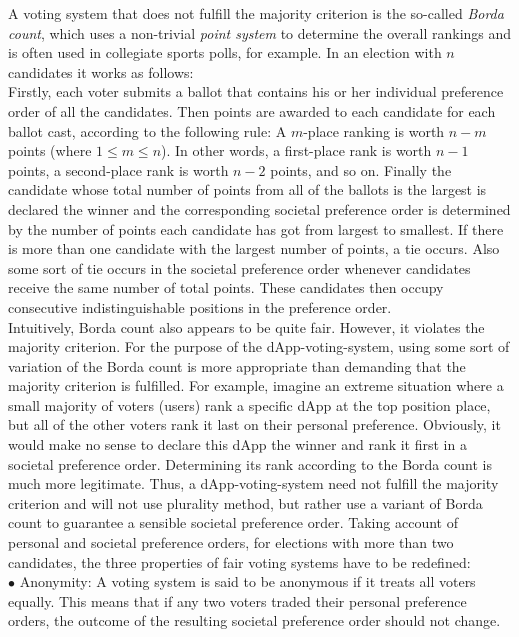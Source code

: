 A voting system that does not fulfill the majority criterion is the so-called {\emph{Borda count}}, which uses a non-trivial {\emph{point system}} to determine the overall rankings and is often used in collegiate sports polls, for example. In an election with $n$ candidates it works as follows: \\
Firstly, each voter submits a ballot that contains his or her individual preference order of all the candidates. 
Then points are awarded to each candidate for each ballot cast, according to the following rule: 
A $m$-place ranking is worth $n-m$ points (where $1\leq m \leq n$). In other words, a first-place rank is worth $n-1$ points, a second-place rank is worth $n-2$ points, and so on. 
Finally the candidate whose total number of points from all of the ballots is the largest is declared the winner and the corresponding societal preference order is determined by the number of points each candidate has got from largest to smallest. If there is more than one candidate with the largest number of points, a tie occurs. Also some sort of tie occurs in the societal preference order whenever candidates receive the same number of total points. These candidates then occupy consecutive indistinguishable positions in the preference order. \\
Intuitively, Borda count also appears to be quite fair. However, it violates the majority criterion. For the purpose of the dApp-voting-system, using some sort of variation of the Borda count is more appropriate than demanding that the majority criterion is fulfilled. For example, imagine an extreme situation where a small majority of voters (users) rank a specific dApp at the top position place, but all of the other voters rank it last on their personal preference. Obviously, it would make no sense to declare this dApp the winner and rank it first in a societal preference order. Determining its rank according to the Borda count is much more legitimate. 
Thus, a dApp-voting-system need not fulfill the majority criterion and will not use plurality method, but rather use a variant of Borda count to guarantee a sensible societal preference order. Taking account of personal and societal preference orders, for elections with more than two candidates, the three properties of fair voting systems have to be redefined: \\
$\bullet$ Anonymity: A voting system is said to be anonymous if it treats all voters equally. This means that if any two voters traded their personal preference orders, the outcome of the resulting societal preference order should not change. \\
